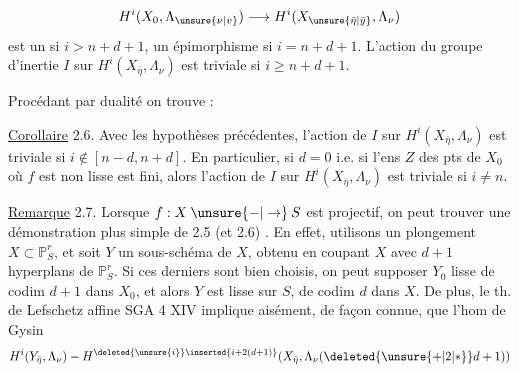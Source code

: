 \[
H^i(X_0,\Lambda_{\unsure{\nu|v}})\longrightarrow H^i(X_{\unsure{\bar\eta|\bar y}},\Lambda_\nu)
\]
est un  si $i>n+d+1$, un épimorphisme si $i=n+d+1$. L'action du groupe d'inertie  $I$ sur $H^i(X_{\bar\eta},\Lambda_\nu)$ est triviale si $i\geq n+d+1$.

Procédant par dualité on trouve :

\uline{Corollaire} 2.6. Avec les hypothèses précédentes, l'action de $I$ sur $H^i(X_{\bar\eta},\Lambda_\nu)$ est triviale si $i\notin[n-d,n+d]$.
En particulier, si $d=0$ i.e. si l'ens $Z$ des pts de $X_0$ où $f$ est non lisse est fini, alors l'action de $I$ sur $H^i(X_{\bar\eta},\Lambda_\nu)$ est triviale si $i\ne n$.

\uline{Remarque} 2.7. Lorsque $f:X\mathbin{\unsure{-|\to}}S$ est projectif, on peut trouver une démonstration plus simple de  2.5 (et  2.6) . En effet,  utilisons un plongement $X\subset\mathbb P^r_S$, et soit $Y$ un sous-schéma de $X$, obtenu en coupant $X$ avec $d+1$  hyperplans de $\mathbb P^r_S$.
Si ces derniers sont bien choisis, on peut supposer $Y_0$ lisse de codim $d+1$ dans $X_0$, et alors $Y$ est lisse sur $S$, de codim $d$ dans $X$. De plus, le th. de Lefschetz affine SGA 4 XIV implique aisément,  de façon connue, que l'hom de Gysin
\[
H^i(Y_{\bar\eta},\Lambda_\nu)\mathbin{-}H^{\deleted{\unsure{i}}\inserted{i+2(d+1)}}(X_{\bar\eta},\Lambda_\nu(\deleted{\unsure{+|2|*}}d+1))
\]
